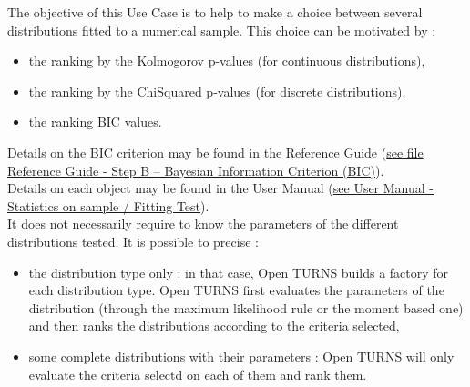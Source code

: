 \renewcommand{\filename}{docUC_InputWithData_ChoiceFittedDistributions.tex}
\renewcommand{\filetitle}{UC : Making a choice between multiple fitted distributions :  Kolmogorov ranking, ChiSquared ranking and BIC ranking}

\HeaderIIILevel




The objective of this Use Case is to help to make a choice between several distributions fitted to a numerical sample. This choice can be motivated by :
\begin{itemize}
\item the ranking by the Kolmogorov p-values (for continuous distributions),
\item the ranking by the ChiSquared p-values (for discrete distributions),
\item the ranking BIC values.
\end{itemize}


Details on the BIC criterion may be found in the Reference Guide (\href{OpenTURNS_ReferenceGuide.pdf}{see file Reference Guide - Step B -- Bayesian Information Criterion (BIC)}).\\

Details on each object may be found in the User Manual  (\href{OpenTURNS_UserManual_TUI.pdf}{see User Manual - Statistics on sample / Fitting Test}).\\

It does not necessarily require to  know the parameters of the different distributions tested. It is possible to precise :
\begin{itemize}
\item the distribution type only : in that case, Open TURNS builds a factory for each distribution type. Open TURNS first evaluates  the parameters of the distribution (through the maximum likelihood rule or the moment based one) and then  ranks the distributions according to the criteria selected,
\item some complete distributions with their parameters : Open TURNS will only evaluate the criteria selectd on each of them and rank them.
\end{itemize}



